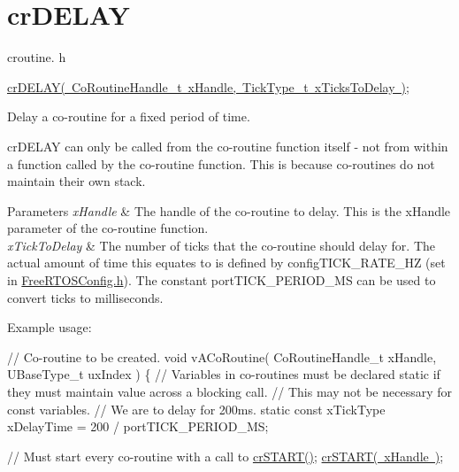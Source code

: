 \hypertarget{group__cr_d_e_l_a_y}{}\section{cr\+D\+E\+L\+AY}
\label{group__cr_d_e_l_a_y}
croutine. h 
\begin{DoxyPre}
\mbox{\hyperlink{croutine_8h_a05a06feb11028f2d1d440ea335f562ba}{crDELAY( CoRoutineHandle\_t xHandle, TickType\_t xTicksToDelay )}};\end{DoxyPre}


Delay a co-\/routine for a fixed period of time.

cr\+D\+E\+L\+AY can only be called from the co-\/routine function itself -\/ not from within a function called by the co-\/routine function. This is because co-\/routines do not maintain their own stack.


\begin{DoxyParams}{Parameters}
{\em x\+Handle} & The handle of the co-\/routine to delay. This is the x\+Handle parameter of the co-\/routine function.\\
\hline
{\em x\+Tick\+To\+Delay} & The number of ticks that the co-\/routine should delay for. The actual amount of time this equates to is defined by config\+T\+I\+C\+K\+\_\+\+R\+A\+T\+E\+\_\+\+HZ (set in \mbox{\hyperlink{_free_r_t_o_s_config_8h}{Free\+R\+T\+O\+S\+Config.\+h}}). The constant port\+T\+I\+C\+K\+\_\+\+P\+E\+R\+I\+O\+D\+\_\+\+MS can be used to convert ticks to milliseconds.\\
\hline
\end{DoxyParams}
Example usage\+: 
\begin{DoxyPre}
// Co-routine to be created.
void vACoRoutine( CoRoutineHandle\_t xHandle, UBaseType\_t uxIndex )
\{
// Variables in co-routines must be declared static if they must maintain value across a blocking call.
// This may not be necessary for const variables.
// We are to delay for 200ms.
static const xTickType xDelayTime = 200 / portTICK\_PERIOD\_MS;\end{DoxyPre}



\begin{DoxyPre}    // Must start every co-routine with a call to \mbox{\hyperlink{croutine_8h_a19a57a201a325e8af1207ed68c4aedde}{crSTART()}};
    \mbox{\hyperlink{croutine_8h_a19a57a201a325e8af1207ed68c4aedde}{crSTART( xHandle )}};\end{DoxyPre}



